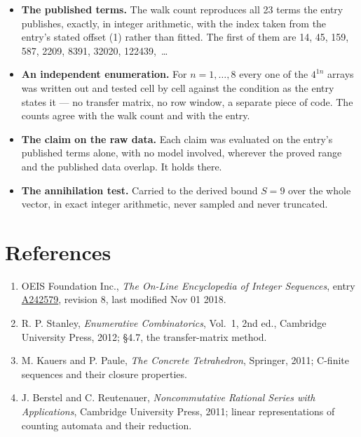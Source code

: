 \documentclass[11pt]{article}
\theoremstyle{definition}
\begin{document}
\begin{itemize}

\item {\bfseries The published terms.} The walk count reproduces all 23 terms the entry publishes, exactly, in integer arithmetic, with the index taken from the entry's stated offset (1) rather than fitted. The first of them are 14, 45, 159, 587, 2209, 8391, 32020, 122439,~\dots

\item {\bfseries An independent enumeration.} For $n = 1,\dots,8$ every one of the $4^{1n}$ arrays was written out and tested cell by cell against the condition as the entry states it --- no transfer matrix, no row window, a separate piece of code. The counts agree with the walk count and with the entry.

\item {\bfseries The claim on the raw data.} Each claim was evaluated on the entry's published terms alone, with no model involved, wherever the proved range and the published data overlap. It holds there.

\item {\bfseries The annihilation test.} Carried to the derived bound $S = 9$ over the whole vector, in exact integer arithmetic, never sampled and never truncated.

\end{itemize}

\section{References}

\begin{enumerate}

\item OEIS Foundation Inc., \emph{The On-Line Encyclopedia of Integer Sequences}, entry \href{https://oeis.org/A242579}{A242579}, revision 8, last modified Nov 01 2018.

\item R. P. Stanley, \emph{Enumerative Combinatorics}, Vol.~1, 2nd ed., Cambridge University Press, 2012; \S4.7, the transfer-matrix method.

\item M. Kauers and P. Paule, \emph{The Concrete Tetrahedron}, Springer, 2011; C-finite sequences and their closure properties.

\item J. Berstel and C. Reutenauer, \emph{Noncommutative Rational Series with Applications}, Cambridge University Press, 2011; linear representations of counting automata and their reduction.

\end{enumerate}
\end{document}
